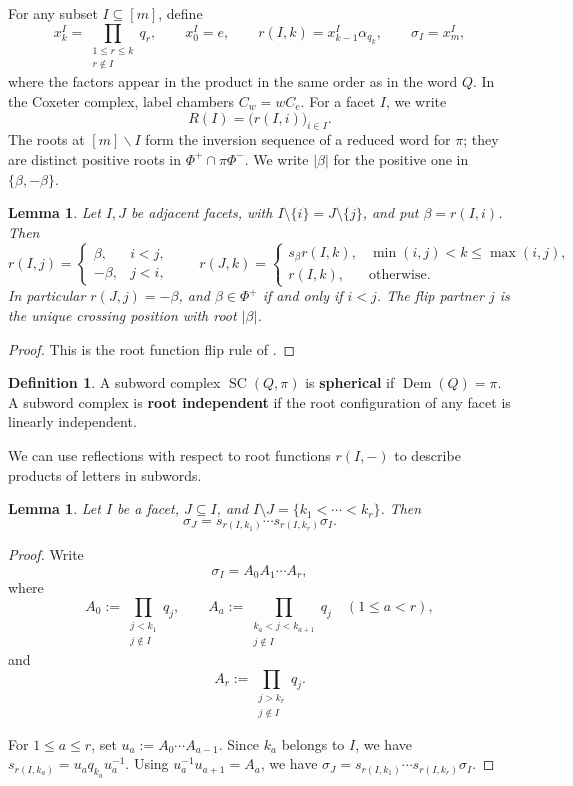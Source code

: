 \documentclass[11pt,a4paper]{article}
\newtheorem{lemma}[theorem]{Lemma}
\theoremstyle{definition}
\newtheorem{definition}[theorem]{Definition}
\theoremstyle{remark}
\newcommand{\SC}{\operatorname{SC}}
\newcommand{\Dem}{\operatorname{Dem}}
\numberwithin{equation}{section}
\begin{document}
For any subset $I\subseteq[m]$, define
\[
 x_k^I=\prod_{\substack{1\le r\le k\\r\notin I}}q_r,
 \qquad x_0^I=e,\qquad
 r(I,k)=x_{k-1}^I\alpha_{q_k},\qquad \sigma_I=x_m^I,
\]
where the factors appear in the product in the same order as in the word $Q$. In the Coxeter complex, label chambers $C_w=wC_e$. For a facet $I$, we write
\[
 R(I)=\bigl(r(I,i)\bigr)_{i\in I}.
\]
The roots at $[m]\backslash I$ form the inversion sequence of a reduced word for $\pi$; they are distinct positive roots in $\Phi^+\cap\pi\Phi^-$. We write $|\beta|$ for the positive one in $\{\beta,-\beta\}$.

\begin{lemma}\label{lem:flip}
Let $I,J$ be adjacent facets, with $I\setminus\{i\}=J\setminus\{j\}$, and put $\beta=r(I,i)$. Then
\begin{equation}\label{eq:flip-root}
 r(I,j)=\begin{cases}\beta,&i<j,\\-\beta,&j<i,\end{cases}
 \qquad
 r(J,k)=\begin{cases}s_\beta r(I,k),&\min(i,j)<k\le\max(i,j),\\
 r(I,k),&\text{otherwise}.
 \end{cases}
\end{equation}
In particular $r(J,j)=-\beta$, and $\beta\in\Phi^+$ if and only if $i<j$. The flip partner $j$ is the unique crossing position with root $|\beta|$.
\end{lemma}
\begin{proof}
 This is the root function flip rule of \cite[Lemma~3.3 and Lemma~3.6]{CLS}.
\end{proof}

\begin{definition}
A subword complex $\SC(Q,\pi)$ is \textbf{spherical} if $\Dem(Q)=\pi$. 
A subword complex is \textbf{root independent} if the root configuration of any facet is linearly independent.
\end{definition}

We can use reflections with respect to root functions $r(I,-)$ to describe products of letters in subwords.
\begin{lemma}\label{lem:insertion}
Let $I$ be a facet, $J\subseteq I$, and $I\setminus J=\{k_1<\cdots<k_r\}$. Then
\[
 \sigma_J=s_{r(I,k_1)}\cdots s_{r(I,k_r)}\sigma_I.
\]
\end{lemma}

\begin{proof}
Write
\[
\sigma_I=A_0A_1\cdots A_r,
\]
where
\[
A_0:=\prod_{\substack{j<k_1\\ j\notin I}} q_j,\qquad
A_a:=\prod_{\substack{k_a<j<k_{a+1}\\ j\notin I}} q_j
\quad (1\le a<r),
\]
and
\[
A_r:=\prod_{\substack{j>k_r\\ j\notin I}} q_j.
\]


For \(1\le a\le r\), set $u_a:=A_0\cdots A_{a-1}$.
Since \(k_a\) belongs to $I$, we have $s_{r(I,k_a)}=u_a q_{k_a}u_a^{-1}$. Using $u_a^{-1}u_{a+1}=A_a$, we have $\sigma_J = s_{r(I,k_1)}\cdots s_{r(I,k_r)}\sigma_I$.
\end{proof}
\end{document}
